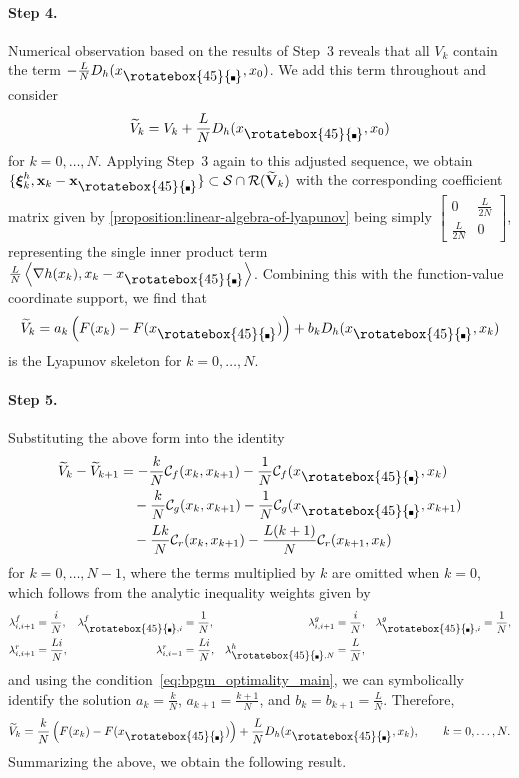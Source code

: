 \documentclass{article}
\theoremstyle{definition}
\theoremstyle{plain}
\newcommand{\vxi}{{\boldsymbol{\xi}}}
\newcommand{\vx}{{\mathbf{x}}}
\newcommand{\vV}{{\mathbf{V}}}
\newcommand{\cC}{{\mathcal{C}}}
\newcommand{\cR}{{\mathcal{R}}}
\newcommand{\cS}{{\mathcal{S}}}
\newcommand{\inprod}[2]{\left\langle #1,#2 \right\rangle}
\newcommand{\pr}[1]{\left( #1 \right)}
\newcommand{\compidx}{%
  \mathord{\mathchoice
    {\vcenter{\hbox{\rotatebox{45}{\rule{0.39em}{0.39em}}}}}
    {\vcenter{\hbox{\rotatebox{45}{\rule{0.39em}{0.39em}}}}}
    {\vcenter{\hbox{\rotatebox{45}{\rule{0.29em}{0.29em}}}}}
    {\vcenter{\hbox{\rotatebox{45}{\rule{0.23em}{0.23em}}}}}}%
}
\newcommand{\bregsm}{f}
\newcommand{\bregprox}{g}
\newcommand{\bregaux}{r}
\begin{document}
\paragraph{Step 4.}
Numerical observation based on the results of Step~3 reveals that all $V_k$ contain the term $-\frac{L}{N} D_h(x_{\compidx}, x_0)$.
We add this term throughout and consider
\[
    \widetilde V_k
    =
    V_k+\frac{L}{N}D_h(x_{\compidx},x_0)
\]
for $k=0,\dots,N$.
Applying Step~3 again to this adjusted sequence, we obtain $\{\vxi_k^h,\vx_k-\vx_{\compidx}\}\subset\cS\cap\cR(\widetilde{\vV}_k)$ with the corresponding coefficient matrix given by \cref{proposition:linear-algebra-of-lyapunov} being simply $\begin{bmatrix} 0 & \frac{L}{2N}\\ \frac{L}{2N} & 0 \end{bmatrix}$, representing the single inner product term $\frac{L}{N}\inprod{\nabla h(x_k)}{x_k-x_{\compidx}}$.
Combining this with the function-value coordinate support, we find that
\[
    \widetilde V_k = a_k\pr{F(x_k)-F(x_{\compidx})} + b_kD_h(x_{\compidx},x_k)
\]
is the Lyapunov skeleton for $k=0,\dots,N$.


\paragraph{Step 5.}
Substituting the above form into the identity
\begin{align}
\label{eq:bpgm_difference_identity}
\begin{aligned}
    \widetilde V_k-\widetilde V_{k+1}
    & =
    -\frac{k}{N}\cC_{\bregsm}(x_k,x_{k+1})
    -\frac{1}{N}\cC_{\bregsm}(x_{\compidx},x_k) \\
    & \quad 
    -\frac{k}{N}\cC_{\bregprox}(x_k,x_{k+1})
    -\frac{1}{N}\cC_{\bregprox}(x_{\compidx},x_{k+1}) \\
    & \quad 
    -\frac{Lk}{N}\cC_{\bregaux}(x_k,x_{k+1})
    -\frac{L(k+1)}{N} \cC_{\bregaux}(x_{k+1},x_k)
\end{aligned}
\end{align}
for $k=0,\dots,N-1$, where the terms multiplied by $k$ are omitted when $k=0$, 
which follows from the analytic inequality weights given by
\[
    \begin{aligned}
    \lambda^{\bregsm}_{i,i+1}&=\frac{i}{N},&
    \lambda^{\bregsm}_{\compidx,i}&=\frac{1}{N},&
    \lambda^{\bregprox}_{i,i+1}&=\frac{i}{N},&
    \lambda^{\bregprox}_{\compidx,i}&=\frac{1}{N},\\
    \lambda^{\bregaux}_{i,i+1}&=\frac{Li}{N},&
    \lambda^{\bregaux}_{i,i-1}&=\frac{Li}{N},&
    \lambda^h_{\compidx,N}&=\frac{L}{N},
    \end{aligned}
\]
and using the condition~\eqref{eq:bpgm_optimality_main}, 
we can symbolically identify the solution $a_k = \frac{k}{N}$, $a_{k+1} = \frac{k+1}{N}$, and $b_k=b_{k+1}=\frac{L}{N}$.
Therefore,
\begin{align}
\label{eqn:bpgm-lyapunov}
    \widetilde V_k=\frac{k}{N}\pr{F(x_k)-F(x_{\compidx})}+\frac{L}{N}D_h(x_{\compidx},x_k),
    \qquad k=0,\dots,N.
\end{align}
Summarizing the above, we obtain the following result.
\end{document}
